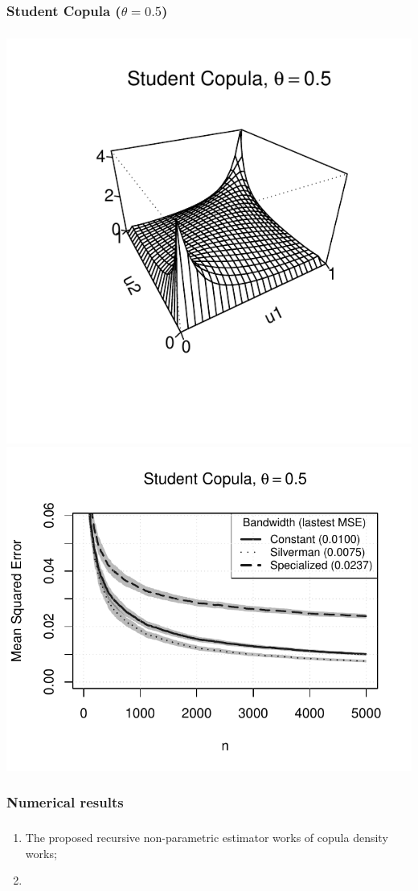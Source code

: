 \documentclass[aspectratio=169]{beamer}
\begin{document}
		\subsubsection{Student Copula ($ \theta = 0.5 $)}
			\begin{frame}
				\frametitle{\insertsubsubsection}
				
				\begin{flushleft}
					\includegraphics[width=0.4\linewidth]{plots/numerical_results/student05}
					\includegraphics[width=0.5\linewidth]{../text/plots/experiment_results/student05}
				\end{flushleft}
				
			\end{frame}
			
		\subsubsection{Numerical results}
			\begin{frame}
				\frametitle{\insertsubsubsection}
				
				\begin{enumerate}
					\item The proposed recursive non-parametric estimator works of copula density works;
					\item 
				\end{enumerate}
				
			\end{frame}	
	
\end{document}
